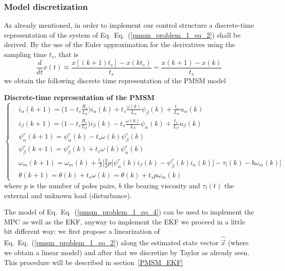 \documentclass[11pt,a4paper]{scrartcl}
\numberwithin{equation}{section}
\theoremstyle{it}
\theoremstyle{definition}
\renewcommand{\eqref}[1]{Eq.~(\ref{#1})}
\begin{document}
\begin{onehalfspace}
\subsubsection{Model discretization}
As already mentioned, in order to implement our control structure a discrete-time representation 
of the system of Eq.~\eqref{pmsm_problem_1_eq_2} shall be derived. By the use of 
the Euler approximation for the derivatives using the sampling time $t_s$, that is 
\begin{equation}\label{pmsm_problem_1_eq_3}
	\frac{d}{dt}x(t)\approx\frac{x[(k+1)t_s]-x(kt_s)}{t_s}=\frac{x(k+1)-x(k)}{t_s}
\end{equation}
we obtain the following discrete time representation of the PMSM model
\begin{mybox}
	\textbf{Discrete-time representation of the PMSM}
	\begin{equation}\label{pmsm_problem_1_eq_4}
		\left\lbrace \begin{aligned}
			& i_\alpha(k+1)=\Big(1-t_s\frac{R_s}{L_\alpha}\Big) i_\alpha(k) 
			+t_s\frac{\omega(k)}{L_\alpha}\psi_\beta(k)+\frac{t_s}{L_\alpha}u_\alpha(k)
			\\[6pt]
			& i_\beta(k+1) = \Big(1-t_s\frac{R_s}{L_\beta}\Big)i_\beta(k) 
			-t_s\frac{\omega(k)}{L_\beta}\psi_\alpha(k)+\frac{t_s}{L_\beta}u_\beta(k)
			\\[6pt]
			&\psi_\alpha^r(k+1) = \psi_\alpha^r(k) -t_s\omega(k)\psi_\beta^r(k) 
			\\[6pt]
			&\psi_\beta^r(k+1) = \psi_\beta^r(k) + t_s\omega(k)\psi_\alpha^r(k) 
			\\[6pt]
			&\omega_m(k+1) = \omega_m(k) + \frac{t_s}{J}\Bigg[\frac{3}{2}p 
			\Big[\psi^r_{\alpha}(k)i_{\beta}(k)-\psi^r_{\beta}(k)i_{\alpha}(k)\Big] 
			-\tau_l(k) -b{\omega}_m(k) \Bigg]\\[6pt]
			& {\theta}(k+1) = {\theta}(k) + t_s\omega(k) ={\theta}(k) + t_s 
			p\omega_m(k)
		\end{aligned} \right. 
	\end{equation}
	where $p$ is the number of poles pairs, $b$ the bearing viscosity and 
	$\tau_l(t)$ the external and unknown load (disturbance).
\end{mybox}
The model of Eq.~\eqref{pmsm_problem_1_eq_4} can be used to implement the MPC as well as the EKF, anyway to implement the EKF we proceed in a little bit different way: we first propose a linearization of Eq.~\eqref{pmsm_problem_1_eq_2} along the estimated state vector $\hat{\vec{x}}$ (where we obtain a linear model) and after that we discretize by Taylor as already seen. This procedure will be described in section~\ref{PMSM_EKF}


\end{onehalfspace}
\end{document}
